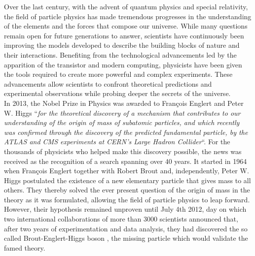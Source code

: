 Over the last century, with the advent of quantum physics and special relativity, the field of particle physics has made tremendous progresses in the understanding of the elements and the forces that compose our universe. While many questions remain open for future generations to answer, scientists have continuously been improving the models developed to describe the building blocks of nature and their interactions. Benefiting from the technological advancements led by the apparition of the transistor and modern computing, physicists have been given the tools required to create more powerful and complex experiments. These advancements allow scientists to confront theoretical predictions and experimental observations while probing deeper the secrets of the universe. \\

In 2013, the Nobel Prize in Physics was awarded to Fran\c{c}ois Englert and Peter W. Higgs ``\textit{for the theoretical discovery of a mechanism that contributes to our understanding of the origin of mass of subatomic particles, and which recently was confirmed through the discovery of the predicted fundamental particle, by the ATLAS and CMS experiments at CERN's Large Hadron Collider}``. For the thousands of physicists who helped make this discovery possible, the news was received as the recognition of a search spanning over 40 years. It started in 1964 when Fran\c{c}ois Englert together with Robert Brout \cite{PhysRevLett.13.321} and, independently, Peter W. Higgs \cite{PhysRevLett.13.508} postulated the existence of a new elementary particle that gives mass to all others. They thereby solved the ever present question of the origin of mass in the theory as it was formulated, allowing the field of particle physics to leap forward. However, their hypothesis remained unproven until July 4th 2012, day on which two international collaborations of more than 3000 scientists announced that, after two years of experimentation and data analysis, they had discovered the so called Brout-Englert-Higgs boson \cite{PhysRevLett.114.191803}, the missing particle which would validate the famed theory. \\

